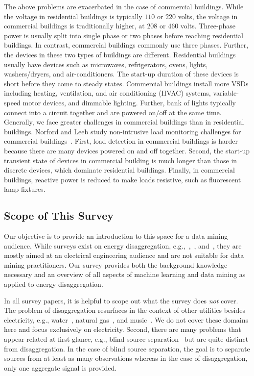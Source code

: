 The above problems are exacerbated in the case of commercial buildings.
While the voltage in residential buildings is typically $110$ or $220$ volts, 
the voltage in commercial buildings is
traditionally higher, at $208$ or $460$ volts.
Three-phase power is usually split
into single phase or two phases before reaching residential buildings.
In contrast, commercial buildings commonly use three phases.
Further, the devices in these two types of buildings are different.
Residential buildings
usually have devices such as microwaves,
refrigerators, ovens, lights, washers/dryers, and
air-conditioners.
The start-up duration of these devices
is short before they come to steady states.
Commercial buildings install more VSDs
including heating, ventilation, and air conditioning (HVAC) systems, 
variable-speed motor devices, and dimmable lighting. 
Further, bank of lights typically connect into a circuit together and
are powered on/off at the same time.
Generally, we face greater challenges in commercial buildings
than in residential buildings.
Norford and Leeb study non-intrusive load monitoring
challenges for commercial buildings~\cite{norford1996non}.
First,  load detection in commercial buildings is harder
because there are many devices powered on and off together.
Second, the start-up transient state of devices in commercial building is
much longer than those in discrete devices,
which dominate residential buildings.
Finally, in commercial buildings, reactive power is reduced to
make loads resistive, such as fluorescent lamp fixtures.


\subsection{Scope of This Survey}
Our objective is to provide an introduction to this space for a data
mining audience. While surveys exist on energy disaggregation,
e.g.,~\cite{zeifman2011nonintrusive},~\cite{liang2010load}, and~\cite{zoha2012survey}, they are mostly aimed at an electrical engineering audience and are
not suitable for data mining practitioners. Our survey provides both 
the background knowledge necessary and an overview of all aspects of
machine learning and data mining as applied to energy disaggregation.

In all survey papers, it is helpful to scope out what the survey does {\it not}
cover. The problem of disaggregation resurfaces in the
context of other utilities besides electricity, e.g.,
water~\cite{dai2011multi}, 
natural gas~\cite{froehlich2011disaggregated}, and music~\cite{schmidt2006nonnegative}. We do not cover these domains here and focus exclusively on electricity.
Second, there are many problems that appear related at first glance,
e.g., blind source separation~\cite{blumensath2005shift,davies2007source,lewicki2000learning} but are quite distinct from disaggregation. In the case of blind
source separation, the goal is to separate sources from at least as many
observations whereas in the case of disaggregation, only one aggregate signal
is provided.

